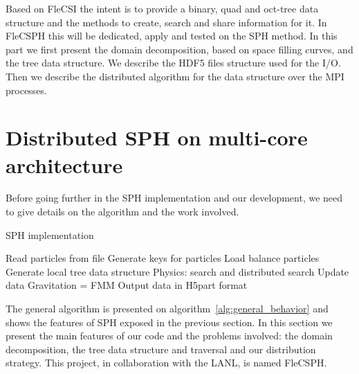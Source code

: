 Based on FleCSI the intent is to provide a binary, quad and oct-tree data structure and the methods to create, search and share information for it. 
In FleCSPH this will be dedicated, apply and tested on the SPH method. 
In this part we first present the domain decomposition, based on space filling curves, and the tree data structure.
We describe the HDF5 files structure used for the I/O.
Then we describe the distributed algorithm for the data structure over the MPI processes. 

\section{Distributed SPH on multi-core architecture}
Before going further in the SPH implementation and our development, we need to give details on the algorithm and the work involved. 
%
\begin{algorithm}
\caption{SPH implementation}\label{alg:general_behavior}
\begin{algorithmic}[1]
\State Read particles from file 
\State Generate keys for particles 
\State Load balance particles 
\State Generate local tree data structure
\State Physics: search and distributed search
\State Update data 
\EndWhile
\State Gravitation = FMM
\State Output data in H5part format
\EndIf
\EndWhile
\end{algorithmic}
\end{algorithm}
%
The general algorithm is presented on algorithm~\ref{alg:general_behavior} and shows the features of SPH exposed in the previous section. 
In this section we present the main features of our code and the problems involved: the domain decomposition, the tree data structure and traversal and our distribution strategy. 
This project, in collaboration with the LANL, is named FleCSPH. 

